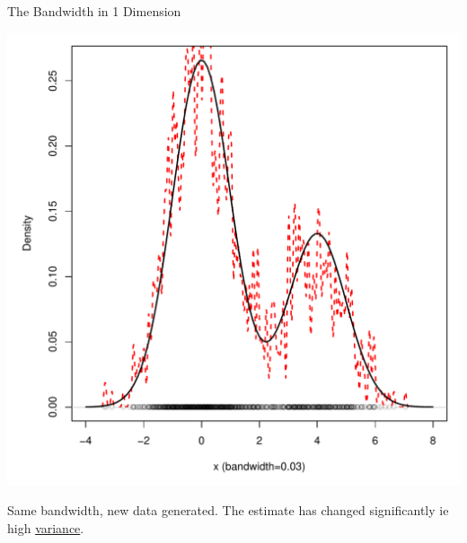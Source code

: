 \documentclass[12pt]{beamer}
\begin{document}
\begin{frame}{The Bandwidth in 1 Dimension}


  \begin{center}
    \includegraphics[scale=0.4]{figs/density1_2.pdf}
    \end{center}

\vspace{-.2in}

\begin{center}
  Same bandwidth, new data generated. The estimate has changed significantly ie high \underline{variance}.
\end{center}
  
\end{frame}
\end{document}
